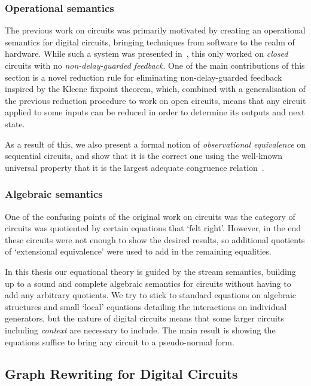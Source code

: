 \subsubsection{Operational semantics}

The previous work on circuits was primarily motivated by creating an operational
semantics for digital circuits, bringing techniques from software to the realm
of hardware.
While such a system was presented in~\cite{ghica2017diagrammatic}, this only
worked on \emph{closed} circuits with no \emph{non-delay-guarded feedback}.
One of the main contributions of this section is a novel reduction rule for
eliminating non-delay-guarded feedback inspired by the Kleene fixpoint theorem,
which, combined with a generalisation of the previous reduction procedure to
work on open circuits, means that any circuit applied to some inputs can be
reduced in order to determine its outputs and next state.

As a result of this, we also present a formal notion of
\emph{observational equivalence} on sequential circuits, and show that it is the
correct one using the well-known universal property that it is the largest
adequate congruence relation~\cite{gordon1998operational}.

\subsubsection{Algebraic semantics}

One of the confusing points of the original work on circuits was the category
of circuits was quotiented by certain equations that `felt right'.
However, in the end these circuits were not enough to show the desired results,
so additional quotients of `extensional equivalence' were used to add in the
remaining equalities.

In this thesis our equational theory is guided by the stream semantics,
building up to a sound and complete algebraic semantics for circuits without
having to add any arbitrary quotients.
We try to stick to standard equations on algebraic structures and small `local'
equations detailing the interactions on individual generators, but the nature of
digital circuits means that some larger circuits including \emph{context} are
necessary to include.
The main result is showing the equations suffice to bring any circuit to a
pseudo-normal form.

\subsection{Graph Rewriting for Digital Circuits}


